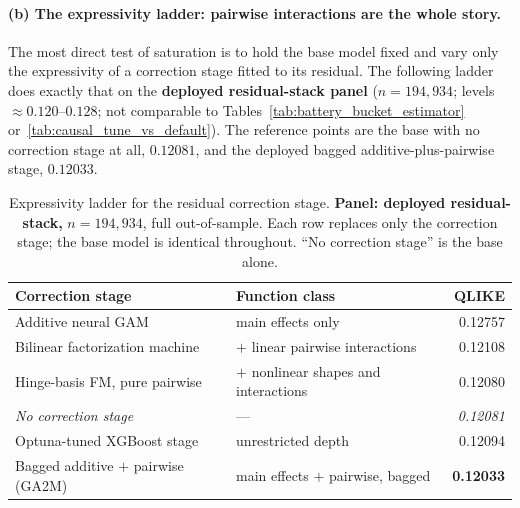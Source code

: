 \paragraph{(b) The expressivity ladder: pairwise interactions are the whole
story.}
The most direct test of saturation is to hold the base model fixed and vary only
the expressivity of a correction stage fitted to its residual. The following
ladder does exactly that on the \textbf{deployed residual-stack panel}
($n = 194{,}934$; levels $\approx 0.120$--$0.128$; not comparable to
Tables~\ref{tab:battery_bucket_estimator} or~\ref{tab:causal_tune_vs_default}).
The reference points are the base with no correction stage at all, $0.12081$, and
the deployed bagged additive-plus-pairwise stage, $0.12033$.

\begin{table}[H]
\centering
\small
\caption{Expressivity ladder for the residual correction stage.
\textbf{Panel: deployed residual-stack,} $n = 194{,}934$, full out-of-sample.
Each row replaces only the correction stage; the base model is identical
throughout. ``No correction stage'' is the base alone.}
\label{tab:expressivity_ladder}
\begin{tabular}{@{}llr@{}}
\toprule
Correction stage & Function class & QLIKE \\
\midrule
Additive neural GAM              & main effects only                    & 0.12757 \\
Bilinear factorization machine   & $+$ linear pairwise interactions      & 0.12108 \\
Hinge-basis FM, pure pairwise    & $+$ nonlinear shapes and interactions & 0.12080 \\
\midrule
\emph{No correction stage}       & ---                                   & \emph{0.12081} \\
Optuna-tuned XGBoost stage       & unrestricted depth                    & 0.12094 \\
\midrule
Bagged additive $+$ pairwise (GA2M) & main effects $+$ pairwise, bagged  & \textbf{0.12033} \\
\bottomrule
\end{tabular}
\end{table}

